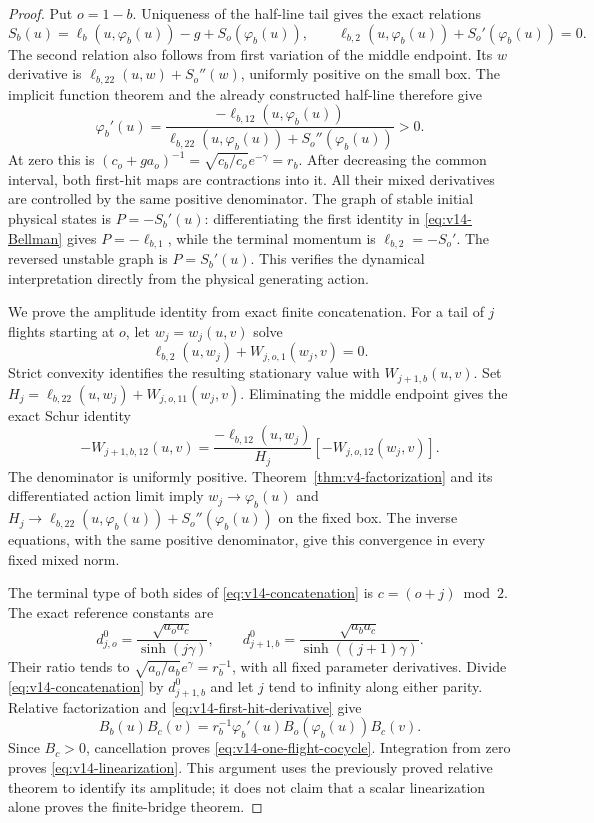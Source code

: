 \begin{proof}
Put $o=1-b$. Uniqueness of the half-line tail gives the exact relations
\begin{equation}\label{eq:v14-Bellman}
 S_b(u)=\ell_b(u,\varphi_b(u))-g+S_o(\varphi_b(u)),\qquad
 \ell_{b,2}(u,\varphi_b(u))+S_o'(\varphi_b(u))=0.
\end{equation}
The second relation also follows from first variation of the middle
endpoint. Its $w$ derivative is
$\ell_{b,22}(u,w)+S_o''(w)$, uniformly positive on the small box.
The implicit function theorem and the already constructed half-line
therefore give
\begin{equation}\label{eq:v14-first-hit-derivative}
 \varphi_b'(u)=
 \frac{-\ell_{b,12}(u,\varphi_b(u))}
 {\ell_{b,22}(u,\varphi_b(u))+S_o''(\varphi_b(u))}>0.
\end{equation}
At zero this is
$(c_o+g a_o)^{-1}=\sqrt{c_b/c_o}e^{-\gamma}=r_b$.
After decreasing the common interval, both first-hit maps are
contractions into it. All their mixed derivatives are controlled by
the same positive denominator. The graph of stable initial physical
states is $P=-S_b'(u)$: differentiating the first identity in
\eqref{eq:v14-Bellman} gives $P=-\ell_{b,1}$, while the terminal
momentum is $\ell_{b,2}=-S_o'$. The reversed unstable graph is
$P=S_b'(u)$. This verifies the dynamical interpretation directly
from the physical generating action.

We prove the amplitude identity from exact finite concatenation.
For a tail of $j$ flights starting at $o$, let $w_j=w_j(u,v)$ solve
\[
 \ell_{b,2}(u,w_j)+W_{j,o,1}(w_j,v)=0.
\]
Strict convexity identifies the resulting stationary value with
$W_{j+1,b}(u,v)$. Set
$H_j=\ell_{b,22}(u,w_j)+W_{j,o,11}(w_j,v)$.
Eliminating the middle endpoint gives the exact Schur identity
\begin{equation}\label{eq:v14-concatenation}
 -W_{j+1,b,12}(u,v)=
 \frac{-\ell_{b,12}(u,w_j)}{H_j}
                          [-W_{j,o,12}(w_j,v)].
\end{equation}
The denominator is uniformly positive. Theorem~\ref{thm:v4-factorization}
and its differentiated action limit imply
$w_j\to\varphi_b(u)$ and
$H_j\to\ell_{b,22}(u,\varphi_b(u))+S_o''(\varphi_b(u))$
on the fixed box. The inverse equations, with the same positive
denominator, give this convergence in every fixed mixed norm.

The terminal type of both sides of \eqref{eq:v14-concatenation}
is $c=(o+j)\bmod2$. The exact reference constants are
\[
 d^0_{j,o}=\frac{\sqrt{a_oa_c}}{\sinh(j\gamma)},\qquad
 d^0_{j+1,b}=\frac{\sqrt{a_ba_c}}{\sinh((j+1)\gamma)}.
\]
Their ratio tends to
$\sqrt{a_o/a_b}e^\gamma=r_b^{-1}$, with all fixed parameter
derivatives. Divide \eqref{eq:v14-concatenation} by
$d^0_{j+1,b}$ and let $j$ tend to infinity along either parity.
Relative factorization and \eqref{eq:v14-first-hit-derivative} give
\[
 B_b(u)B_c(v)=r_b^{-1}\varphi_b'(u)
                   B_o(\varphi_b(u))B_c(v).
\]
Since $B_c>0$, cancellation proves
\eqref{eq:v14-one-flight-cocycle}. Integration from zero proves
\eqref{eq:v14-linearization}. This argument uses the previously
proved relative theorem to identify its amplitude; it does not claim
that a scalar linearization alone proves the finite-bridge theorem.


\end{proof}
